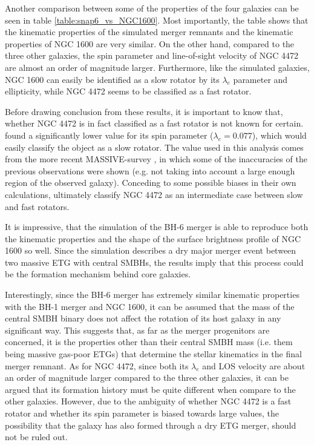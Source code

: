 \documentclass[english, twoside]{HYgradu}
\begin{document}
Another comparison between some of the properties of the four galaxies can be seen in table \ref{table:snap6_vs_NGC1600}. Most importantly, the table shows that the kinematic properties of the simulated merger remnants and the kinematic properties of NGC 1600 are very similar. On the other hand, compared to the three other galaxies, the spin parameter and line-of-sight velocity of NGC 4472 are almost an order of magnitude larger. Furthermore, like the simulated galaxies, NGC 1600 can easily be identified as a slow rotator by its $\lambda_e$ parameter and ellipticity, while NGC 4472 seems to be classified as a fast rotator. 

Before drawing conclusion from these results, it is important to know that, whether NGC 4472 is in fact classified as a fast rotator is not known for certain. \cite{Emsellem2011} found a significantly lower value for its spin parameter ($\lambda_e = 0.077$), which would easily classify the object as a slow rotator. The value used in this analysis comes from the more recent MASSIVE-survey \citep{Ma2014MASSIVE, Veale2017veldisp}, in which some of the inaccuracies of the previous observations were shown (e.g. not taking into account a large enough region of the observed galaxy). Conceding to some possible biases in their own calculations, \cite{Veale2017veldisp} ultimately classify NGC 4472 as an intermediate case between slow and fast rotators.

It is impressive, that the simulation of the BH-6 merger is able to reproduce both the kinematic properties and the shape of the surface brightness profile of NGC 1600 so well. Since the simulation describes a dry major merger event between two massive ETG with central SMBHs, the results imply that this process could be the formation mechanism behind core galaxies. 

Interestingly, since the BH-6 merger has extremely similar kinematic properties with the BH-1 merger and NGC 1600, it can be assumed that the mass of the central SMBH binary does not affect the rotation of its host galaxy in any significant way. This suggests that, as far as the merger progenitors are concerned, it is the properties other than their central SMBH mass (i.e. them being massive gas-poor ETGs) that determine the stellar kinematics in the final merger remnant. As for NGC 4472, since both its $\lambda_e$ and LOS velocity are about an order of magnitude larger compared to the three other galaxies, it can be argued that its formation history must be quite different when compare to the other galaxies. However, due to the ambiguity of whether NGC 4472 is a fast rotator and whether its spin parameter is biased towards large values, the possibility that the galaxy has also formed through a dry ETG merger, should not be ruled out.
\end{document}
